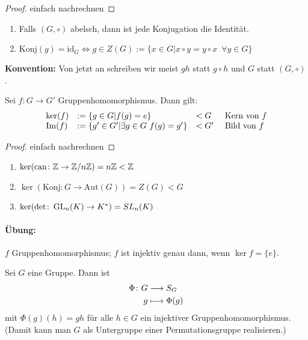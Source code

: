\documentclass[12pt,a4paper]{scrartcl}
\begin{document}
\begin{proof}
	einfach nachrechnen
\end{proof}

\begin{bem}
	\leavevmode
	\begin{enumerate}
		\item 	Falls $(G,\circ)$ abelsch, dann ist jede Konjugation die Identität.
		\item $\text{Konj}(g) = \text{id}_G \Leftrightarrow g\in Z(G):=\{x\in G|x\circ y = y\circ x\enspace \forall y\in G\}$
	\end{enumerate}
\end{bem}

\noindent\textbf{Konvention:} Von jetzt an schreiben wir meist $gh$ statt $g\circ h$ und $G$ statt $(G,\circ)$.

\begin{satz} \label{thm:kerim_g}
	Sei $f\colon G\to G'$ Gruppenhomomorphismus. Dann gilt:	
	\begin{equation*}
	\begin{array}{llll}
		\operatorname{ker}(f) & := \{g\in G|f(g) = e\}                  & <G & \mbox{ Kern von }f\\
		\operatorname{Im}(f)  & := \{g'\in G'|\exists g\in G\ f(g)=g'\} & <G'& \text{ Bild von }f
	\end{array}
	\end{equation*}
\end{satz}

\begin{proof}
	einfach nachrechnen
\end{proof}
\begin{bsp}
	\leavevmode
	\begin{enumerate}
		\item $\operatorname{ker}(\text{can}\colon \mathbb Z\to \mathbb Z/n\mathbb Z) = n\mathbb Z<\mathbb Z$
		\item $\ker(\text{Konj}\colon G\to \text{Aut}(G)) = Z(G)<G$
		\item $\operatorname{ker}(\det\colon \operatorname{GL}_n(K)\to K^*) = SL_n(K)$
	\end{enumerate}
\end{bsp}

\paragraph{Übung:} $f$ Gruppenhomomorphismus; $f$ ist injektiv genau dann, wenn $\ker f = \{e\}$.

\begin{satz}
	Sei $G$ eine Gruppe. Dann ist
	\begin{align*}
		\Phi \colon G&\longrightarrow S_G\\
		g&\longmapsto \Phi(g)
	\end{align*} mit $\Phi(g)(h) = gh$ für alle $h\in G$ ein injektiver Gruppenhomomorphismus. (Damit kann man $G$ als Untergruppe einer Permutationsgruppe \glqq realisieren\grqq.)
\end{satz}
\end{document}

